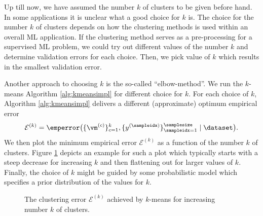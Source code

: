 \documentclass[12pt]{report}
\begin{document}
Up till now, we have assumed the number $k$ of clusters 
to be given before hand. In some applications it is unclear
what a good choice for $k$ is. The choice for the number 
$k$ of clusters depends on how the clustering methods is 
used within an overall ML application. If the clustering method 
serves as a pre-processing for a supervised ML problem, we 
could try out different values of the number $k$ and determine 
validation errors for each choice. Then, we pick value of $k$ 
which results in the smallest validation error. 

Another approach to choosing $k$ is the so-called ``elbow-method''. 
We run the $k$-means Algorithm \ref{alg:kmeansimpl} for different choice 
for $k$. For each choice of $k$, Algorithm \ref{alg:kmeansimpl} delivers a 
different (approximate) optimum empirical error $$\mathcal{E}^{(k)} = \emperror \big( \{\vm^{(c)}\}_{c=1}^{k},\{y^{(\sampleidx)}\}_{\sampleidx=1}^{\samplesize} \mid \dataset \big).$$ 
We then plot the minimum empirical error $\mathcal{E}^{(k)}$ as a 
function of the number $k$ of clusters. Figure \ref{fig_ellbow} depicts 
an example for such a plot which typically starts with a steep decrease 
for increasing $k$ and then flattening out for larger values of $k$. 
Finally, the choice of $k$ might be guided by some probabilistic 
model which specifies a prior distribution of the values for $k$. 


\begin{figure}
\begin{center}
\end{center}
\caption{The clustering error $\mathcal{E}^{(k)}$ achieved by $k$-means for increasing number $k$ of clusters.}
\label{fig_ellbow}
\end{figure}
\end{document}
